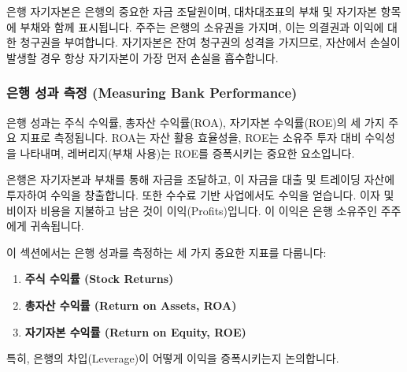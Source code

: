 \documentclass[11pt,a4paper]{article}
\begin{document}
\begin{tcolorbox}[summarybox, title=\textbf{자기자본 요약}]
은행 자기자본은 은행의 중요한 자금 조달원이며, 대차대조표의 부채 및 자기자본 항목에 부채와 함께 표시됩니다. 주주는 은행의 소유권을 가지며, 이는 의결권과 이익에 대한 청구권을 부여합니다. 자기자본은 잔여 청구권의 성격을 가지므로, 자산에서 손실이 발생할 경우 항상 자기자본이 가장 먼저 손실을 흡수합니다.
\end{tcolorbox}

\newpage
\subsubsection{은행 성과 측정 (Measuring Bank Performance)}

\begin{tcolorbox}[mybox, title=\textbf{핵심 요약: 은행 성과 측정}]
은행 성과는 주식 수익률, 총자산 수익률(ROA), 자기자본 수익률(ROE)의 세 가지 주요 지표로 측정됩니다. ROA는 자산 활용 효율성을, ROE는 소유주 투자 대비 수익성을 나타내며, 레버리지(부채 사용)는 ROE를 증폭시키는 중요한 요소입니다.
\end{tcolorbox}

은행은 자기자본과 부채를 통해 자금을 조달하고, 이 자금을 대출 및 트레이딩 자산에 투자하여 수익을 창출합니다. 또한 수수료 기반 사업에서도 수익을 얻습니다. 이자 및 비이자 비용을 지불하고 남은 것이 이익(Profits)입니다. 이 이익은 은행 소유주인 주주에게 귀속됩니다.

이 섹션에서는 은행 성과를 측정하는 세 가지 중요한 지표를 다룹니다:
\begin{enumerate}
    \item \textbf{주식 수익률 (Stock Returns)}
    \item \textbf{총자산 수익률 (Return on Assets, ROA)}
    \item \textbf{자기자본 수익률 (Return on Equity, ROE)}
\end{enumerate}
특히, 은행의 차입(Leverage)이 어떻게 이익을 증폭시키는지 논의합니다.
\end{document}
